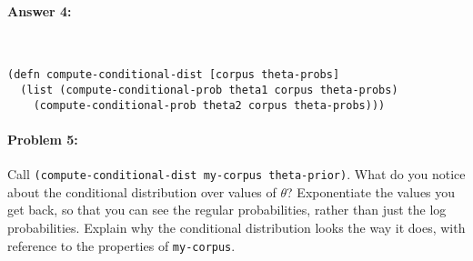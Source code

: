 \documentclass[12pt, letterpaper]{article}
\begin{document}
\paragraph{Answer 4:}~\begin{lstlisting}
(defn compute-conditional-dist [corpus theta-probs]
  (list (compute-conditional-prob theta1 corpus theta-probs)
    (compute-conditional-prob theta2 corpus theta-probs)))
\end{lstlisting}

\hrulefill
\paragraph{Problem 5:}
 
Call \texttt{(compute-conditional-dist my-corpus theta-prior)}. What
do you notice about the conditional distribution over values of
$\theta$?  Exponentiate the values you get back, so that you can see
the regular probabilities, rather than just the log
probabilities. Explain why the conditional distribution looks the way
it does, with reference to the properties of \texttt{my-corpus}.
\end{document}

